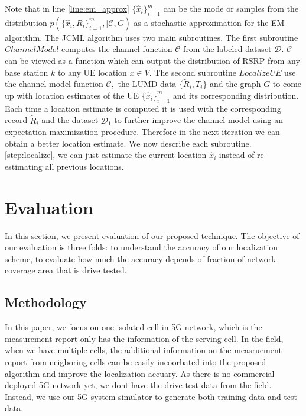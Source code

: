 \documentclass[conference, 10pt]{IEEEtran}
\begin{document}
Note that in line \ref{line:em_approx} $\{\hat{x}_i\}_{i=1}^m$ can be the mode
or samples from the distribution
$p(\{\hat{x}_i,\tilde{R}_i\}_{i=1}^m,|\mathcal{C},G)$ as a stochastic
approximation for the EM algorithm. The JCML algorithm uses two main
subroutines. The first subroutine $ChannelModel$ computes the channel function
$\mathcal{C}$ from the labeled dataset $\mathcal{D}.$ $\mathcal{C}$ can be
viewed as a function which can output the distribution of RSRP from any base
station $k$ to any UE location $x \in V.$ The second subroutine $LocalizeUE$
use the channel model function $\mathcal{C},$ the LUMD data
$\{\tilde{R}_i,T_i\}$ and the graph $G$ to come up with location estimates of
the UE $\{\hat{x}_i\}_{i=1}^m$ and its corresponding distribution. Each time a
location estimate is computed it is used with the corresponding record
$\tilde{R}_i$ and the dataset $\mathcal{D}_1$ to further improve the channel
model using an expectation-maximization procedure. Therefore in the next
iteration we can obtain a better location estimate. We now describe each
subroutine. %
\ref{step:localize}, we can just estimate the current location $\hat{x}_i$
instead of re-estimating all previous locations.


\section{Evaluation}
\label{sec:eval}

In this section, we present evaluation of our proposed technique. The objective of
our evaluation is three folds: to understand the accuracy of our localization scheme, to evaluate
how much the accuracy depends of fraction of network coverage area that is drive
tested.

\subsection{Methodology}
In this paper, we focus on one isolated cell in 5G network, which is the measurement report
only has the information of the serving cell. In the field, when we have multiple cells, the additional
information on the measruement report from neigboring cells can be easily incoorbated into the proposed algorithm and improve the 
localization accuary. As there is no commercial deployed 5G network yet, we dont have the drive test data from the field.
Instead, we use our 5G system simulator to generate both training data and test data.
\end{document}
